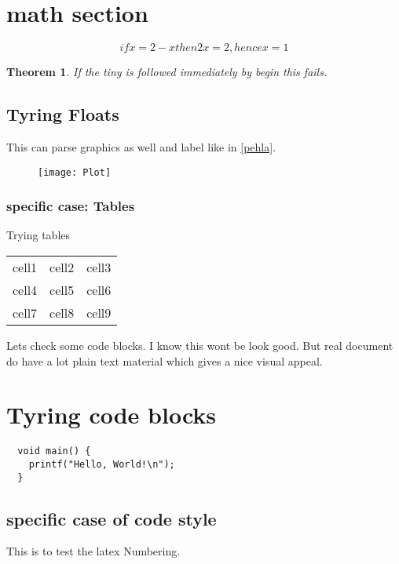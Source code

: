 \documentclass[master.tex]{subfiles}
\newtheorem{theorem}{Theorem}
\begin{document}
  \section{math section}
  \begin{equation}
  if x = 2 - x then 2x = 2, hence x = 1
  \end{equation}

  {\tiny\begin{theorem}
  If the \emph{tiny} is followed immediately by begin this fails.
  \end{theorem}
  }

  \subsection{Tyring Floats}
  This can parse graphics as well and label like in \ref{pehla}.
  \begin{figure}[h]
    \texttt{[image: Plot]}
  \end{figure}

  \subsubsection{specific case: Tables}
  Trying tables
  \begin{tabular}{ c c c }
   cell1 & cell2 & cell3 \\
   cell4 & cell5 & cell6 \\ [1ex]
   cell7 & cell8 & cell9 \\
  \end{tabular}

  Lets check some code blocks. I know this wont be look good. But real document
  do have a lot plain text material which gives a nice visual appeal.

\section{Tyring code blocks}
  \begin{lstlisting}
  void main() {
    printf("Hello, World!\n");
  }
  \end{lstlisting}

  \subsection{specific case of code style}
  This is to test the latex Numbering.
\end{document}
